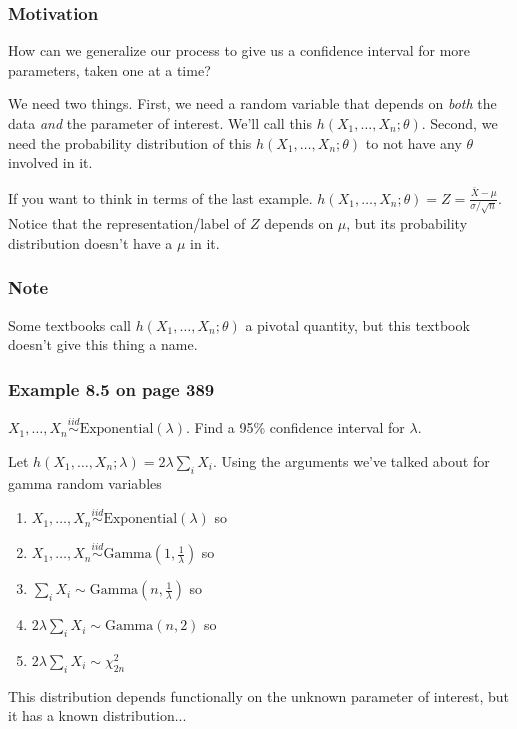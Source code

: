 \documentclass{beamer}
\begin{document}
\begin{frame}
\frametitle{Motivation}

How can we generalize our process to give us a confidence interval for more parameters, taken one at a time?
\newline

We need two things. First, we need a random variable that depends on \emph{both} the data \emph{and} the parameter of interest. We'll call this $h(X_1, \ldots, X_n; \theta)$. Second, we need the probability distribution of this $h(X_1, \ldots, X_n; \theta)$ to not have any $\theta$ involved in it.
\newline

If you want to think in terms of the last example. $h(X_1, \ldots, X_n; \theta) = Z = \frac{\bar{X} - \mu}{\sigma/\sqrt{n}}$. Notice that the representation/label of $Z$ depends on $\mu$, but its probability distribution doesn't have a $\mu$ in it.

\end{frame}


\begin{frame}
\frametitle{Note}

Some textbooks call $h(X_1, \ldots, X_n; \theta)$ a pivotal quantity, but this textbook doesn't give this thing a name. 
\end{frame}


\begin{frame}
\frametitle{Example 8.5 on page 389}

$X_1, \ldots, X_n \overset{iid}{\sim} \text{Exponential}(\lambda)$. Find a 95\% confidence interval for $\lambda$.
\pause
\newline

Let $h(X_1, \ldots, X_n;\lambda) = 2 \lambda \sum_i X_i$. Using the arguments we've talked about for gamma random variables
\begin{enumerate}
\item $X_1, \ldots, X_n \overset{iid}{\sim} \text{Exponential}(\lambda)$ so
\item $X_1, \ldots, X_n \overset{iid}{\sim} \text{Gamma}(1, \frac{1}{\lambda})$ so
\item $\sum_i X_i \sim \text{Gamma}(n, \frac{1}{\lambda})$ so
\item $2 \lambda \sum_i X_i \sim \text{Gamma}(n, 2)$ so
\item $2 \lambda \sum_i X_i \sim \chi^2_{2n}$
\end{enumerate}

This distribution depends functionally on the unknown parameter of interest, but it has a known distribution... 

\end{frame}
\end{document}
